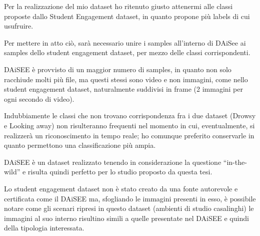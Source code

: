 Per la realizzazione del mio dataset ho ritenuto giusto attenermi alle classi proposte dallo Student Engagement dataset, in quanto propone più labels di cui usufruire.

Per mettere in atto ciò, sarà necessario unire i samples all’interno di DAiSee ai samples dello student engagement dataset, per mezzo delle classi corrispondenti.

DAiSEE è provvisto di un maggior numero di samples, in quanto non solo racchiude molti più file, ma questi stessi sono video e non immagini, come nello student engagement dataset, naturalmente suddivisi in frame (2 immagini per ogni secondo di video).

Indubbiamente le classi che non trovano corrispondenza fra i due dataset (Drowsy e Looking away) non risulteranno frequenti nel momento in cui, eventualmente, si realizzerà un riconoscimento in tempo reale; ho comunque preferito conservarle in quanto permettono una classificazione più ampia.

DAiSEE è un dataset realizzato tenendo in considerazione la questione “in-the-wild” e risulta quindi perfetto per lo studio proposto da questa tesi.

Lo student engagement dataset non è stato creato da una fonte autorevole e certificata come il DAiSEE ma, sfogliando le immagini presenti in esso, è possibile notare come gli scenari ripresi in questo dataset (ambienti di studio casalinghi) le immagini al suo interno risultino simili a quelle presentate nel DAiSEE e quindi della tipologia interessata.

